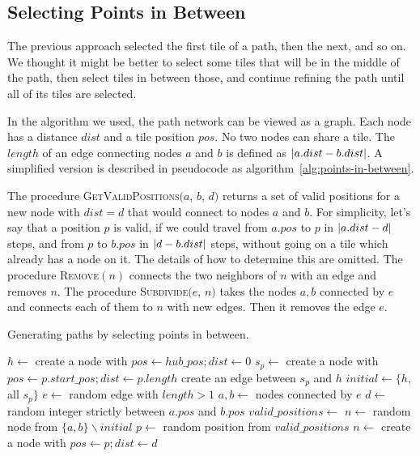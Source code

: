 \subsection{Selecting Points in Between}\label{sec:analysis-points-in-between}

The previous approach selected the first tile of a path, then the next, and so on.
We thought it might be better to select some tiles that will be in the middle of the path, then select tiles in between those, and continue refining the path until all of its tiles are selected.

In the algorithm we used, the path network can be viewed as a graph.
Each node has a distance $dist$ and a tile position $pos$.
No two nodes can share a tile.
The $length$ of an edge connecting nodes $a$ and $b$ is defined as $\left|{a.dist - b.dist}\right|$.
A simplified version is described in pseudocode as algorithm~\ref{alg:points-in-between}.

The procedure \textsc{GetValidPositions}$(a$, $b$, $d)$ returns a set of valid positions for a new node with $dist = d$ that would connect to nodes $a$ and $b$.
For simplicity, let's say that a position $p$ is valid, if we could travel from $a.pos$ to $p$ in $\left|{a.dist - d}\right|$ steps, and from $p$ to $b.pos$ in $\left|{d - b.dist}\right|$ steps, without going on a tile which already has a node on it.
The details of how to determine this are omitted.
The procedure \textsc{Remove}$(n)$ connects the two neighbors of $n$ with an edge and removes $n$.
The procedure \textsc{Subdivide}$(e$, $n)$ takes the nodes $a,b$ connected by $e$ and connects each of them to $n$ with new edges.
Then it removes the edge $e$.

\begin{algorithm}[H]
    \caption{Generating paths by selecting points in between.}
    \label{alg:points-in-between}
    \begin{algorithmic}[0]
        \State $h \gets$ create a node  with $pos \gets hub\_pos; dist \gets 0$
        \State $s_p \gets$ create a node with $pos \gets p.start\_pos; dist \gets p.length$
        \State create an edge between $s_p$ and $h$
        \EndFor
        \State $initial \gets \{h,$ all $s_p\}$
        \Statex
        \State $e \gets$ random edge with $length > 1$
        \State $a, b \gets$ nodes connected by $e$
        \State $d \gets$ random integer strictly between $a.pos$ and $b.pos$
        \State $valid\_positions \gets$ 
        \Statex
        \State $n \gets$ random node from $\{a, b\} \smallsetminus initial$
        \State {}
        \EndIf
        \Else
        \State $p \gets$ random position from $valid\_positions$
        \State $n \gets$ create a node with $pos \gets p; dist \gets d$
        \State {}
        \EndIf
        \EndWhile
        \Statex
    \end{algorithmic}
\end{algorithm}

